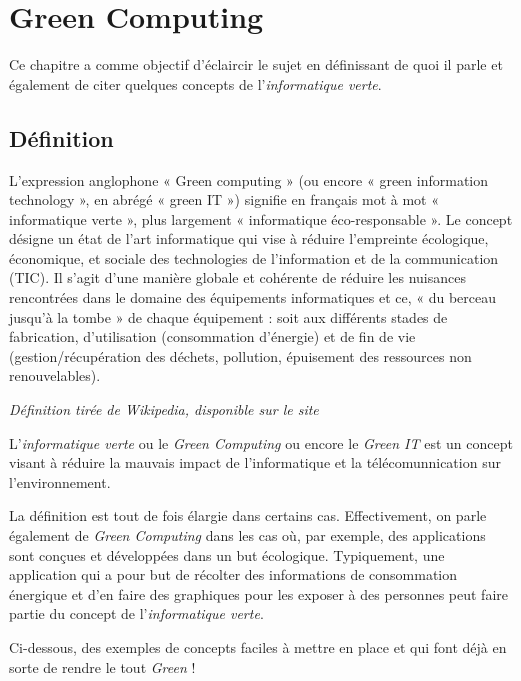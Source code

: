 
\chapter{Green Computing}

Ce chapitre a comme objectif d'éclaircir le sujet en définissant de quoi il parle et également de citer quelques concepts de l'\emph{informatique verte}.
\section{Définition} %
\label{sec:d_finition}
\begin{shadequote}
L'expression anglophone « Green computing » (ou encore « green information technology », en abrégé « green IT ») signifie en français mot à mot « informatique verte », plus largement « informatique éco-responsable ». Le concept désigne un état de l'art informatique qui vise à réduire l'empreinte écologique, économique, et sociale des technologies de l'information et de la communication (TIC). Il s'agit d'une manière globale et cohérente de réduire les nuisances rencontrées dans le domaine des équipements informatiques et ce, « du berceau jusqu'à la tombe » de chaque équipement : soit aux différents stades de fabrication, d'utilisation (consommation d'énergie) et de fin de vie (gestion/récupération des déchets, pollution, épuisement des ressources non renouvelables). \par\emph{Définition tirée de Wikipedia, disponible sur le site \cite{online:wiki:green}}
\end{shadequote}

L'\emph{informatique verte} ou le \emph{Green Computing} ou encore le \emph{Green IT} est un concept visant à réduire la mauvais impact de l'informatique et la télécomunnication sur l'environnement.

\medskip

La définition est tout de fois élargie dans certains cas. Effectivement, on parle également de \emph{Green Computing} dans les cas où, par exemple, des applications sont conçues et développées dans un but écologique. Typiquement, une application qui a pour but de récolter des informations de consommation énergique et d'en faire des graphiques pour les exposer à des personnes peut faire partie du concept de l'\emph{informatique verte}.

\medskip

Ci-dessous, des exemples de concepts faciles à mettre en place et qui font déjà en sorte de rendre le tout \emph{Green} !


